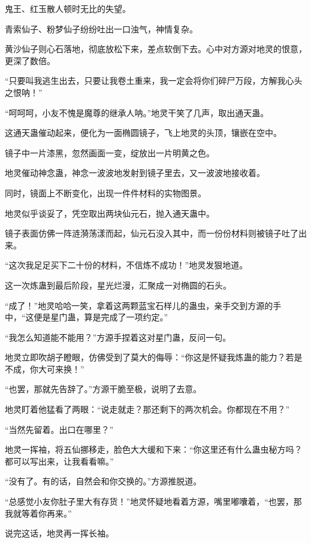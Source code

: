 
\begin{this_body}

鬼王、红玉散人顿时无比的失望。

青索仙子、粉梦仙子纷纷吐出一口浊气，神情复杂。

黄沙仙子则心石落地，彻底放松下来，差点软倒下去。心中对方源对地灵的恨意，更深了数倍。

“只要叫我逃生出去，只要让我卷土重来，我一定会将你们碎尸万段，方解我心头之恨呐！”

“呵呵呵，小友不愧是魔尊的继承人呐。”地灵干笑了几声，取出通天蛊。

这通天蛊催动起来，便化为一面椭圆镜子，飞上地灵的头顶，镶嵌在空中。

镜子中一片漆黑，忽然画面一变，绽放出一片明黄之色。

地灵催动神念蛊，神念一波波地发射到镜子里去，又一波波地接收着。

同时，镜面上不断变化，出现一件件材料的实物图景。

地灵似乎谈妥了，凭空取出两块仙元石，抛入通天蛊中。

镜子表面仿佛一阵涟漪荡漾而起，仙元石没入其中，而一份份材料则被镜子吐了出来。

“这次我足足买下二十份的材料，不信炼不成功！”地灵发狠地道。

这一次炼蛊到最后阶段，星光烂漫，汇聚成一对椭圆的石头。

“成了！”地灵哈哈一笑，拿着这两颗蓝宝石样儿的蛊虫，亲手交到方源的手中，“这便是星门蛊，算是完成了一项约定。”

“我怎么知道能不能用？”方源手捏着这对星门蛊，反问一句。

地灵立即吹胡子瞪眼，仿佛受到了莫大的侮辱：“你这是怀疑我炼蛊的能力？若是不成，你大可来换！”

“也罢，那就先告辞了。”方源干脆至极，说明了去意。

地灵盯着他猛看了两眼：“说走就走？那还剩下的两次机会。你都现在不用？”

“当然先留着。出口在哪里？”

地灵一挥袖，将五仙挪移走，脸色大大缓和下来：“你这里还有什么蛊虫秘方吗？都可以写出来，让我看看嘛。”

“没有了。有的话，自然会和你交换的。”方源推脱道。

“总感觉小友你肚子里大有存货！”地灵怀疑地看着方源，嘴里嘟囔着，“也罢，那我就等着你再来。”

说完这话，地灵再一挥长袖。


\end{this_body}
